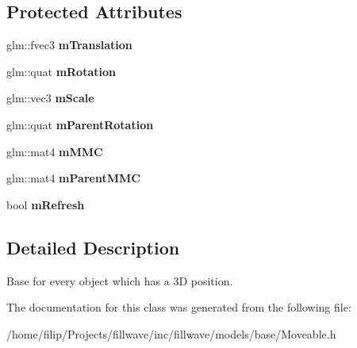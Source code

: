 \subsection*{Protected Attributes}
\begin{DoxyCompactItemize}
\item 
glm\+::fvec3 {\bfseries m\+Translation}\hypertarget{classflw_1_1flf_1_1Moveable_abd1fd2b2b524cdb423e67ba77ca16289}{}\label{classflw_1_1flf_1_1Moveable_abd1fd2b2b524cdb423e67ba77ca16289}

\item 
glm\+::quat {\bfseries m\+Rotation}\hypertarget{classflw_1_1flf_1_1Moveable_aa1c54ef32d7a521204176b96fbc8a15a}{}\label{classflw_1_1flf_1_1Moveable_aa1c54ef32d7a521204176b96fbc8a15a}

\item 
glm\+::vec3 {\bfseries m\+Scale}\hypertarget{classflw_1_1flf_1_1Moveable_ae02a226aef8ed36d884ed411e6178bee}{}\label{classflw_1_1flf_1_1Moveable_ae02a226aef8ed36d884ed411e6178bee}

\item 
glm\+::quat {\bfseries m\+Parent\+Rotation}\hypertarget{classflw_1_1flf_1_1Moveable_ae390565c91451ffcc468e7819bc6d9fe}{}\label{classflw_1_1flf_1_1Moveable_ae390565c91451ffcc468e7819bc6d9fe}

\item 
glm\+::mat4 {\bfseries m\+M\+MC}\hypertarget{classflw_1_1flf_1_1Moveable_ad3c392a33196d2e71163e96e2e9522be}{}\label{classflw_1_1flf_1_1Moveable_ad3c392a33196d2e71163e96e2e9522be}

\item 
glm\+::mat4 {\bfseries m\+Parent\+M\+MC}\hypertarget{classflw_1_1flf_1_1Moveable_a4754ffda38a45ac1994356c59bafcf0b}{}\label{classflw_1_1flf_1_1Moveable_a4754ffda38a45ac1994356c59bafcf0b}

\item 
bool {\bfseries m\+Refresh}\hypertarget{classflw_1_1flf_1_1Moveable_a830442845af89d8fa230124a87059da9}{}\label{classflw_1_1flf_1_1Moveable_a830442845af89d8fa230124a87059da9}

\end{DoxyCompactItemize}


\subsection{Detailed Description}
Base for every object which has a 3D position. 

The documentation for this class was generated from the following file\+:\begin{DoxyCompactItemize}
\item 
/home/filip/\+Projects/fillwave/inc/fillwave/models/base/Moveable.\+h\end{DoxyCompactItemize}
